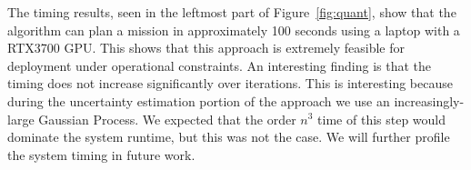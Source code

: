 The timing results, seen in the leftmost part of Figure~\ref{fig:quant}, show that the algorithm can plan a mission in approximately 100 seconds using a laptop with a RTX3700 GPU. This shows that this approach is extremely feasible for deployment under operational constraints. An interesting finding is that the timing does not increase significantly over iterations. This is interesting because during the uncertainty estimation portion of the approach we use an increasingly-large Gaussian Process. We expected that the order $n^3$ time of this step would dominate the system runtime, but this was not the case. We will further profile the system timing in future work.


